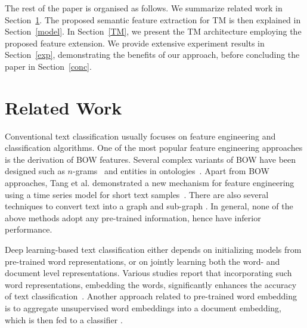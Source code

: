 \documentclass[11pt]{article}
\begin{document}
\par The rest of the paper is organised as follows. We summarize related work in Section~\ref{RW}. The proposed semantic feature extraction for TM is then explained in Section~\ref{model}. In Section~\ref{TM}, we present the  TM architecture employing the proposed feature extension. We provide extensive experiment results in Section~\ref{exp}, demonstrating the benefits of our approach, before concluding the paper in Section~\ref{conc}.





\section{Related Work}\label{RW}
Conventional text classification usually focuses on feature engineering and classification algorithms. One of the most popular feature engineering approaches is the derivation of BOW features. Several complex variants of BOW have been designed such as $n$-grams~\cite{wang2012} and entities in ontologies~\cite{ChenthamarakshanMSL11}. Apart from BOW approaches, Tang et al. demonstrated a new mechanism for feature engineering using a time series model for short text samples~\cite{Tang2020EnrichingFE}. There are also several techniques to convert text into a graph and sub-graph \cite{rousseau2015, Luo2017BridgingSA}. In general, none of the above methods adopt any pre-trained information, hence have inferior performance.

\par Deep learning-based text classification either depends on initializing models from pre-trained word representations, or on jointly learning both the word- and document level representations. Various studies report that incorporating such word representations, embedding the words, significantly enhances the accuracy of text classification~\cite{joulin2017bag,shen2018}. Another approach related to pre-trained word embedding is to aggregate unsupervised word embeddings into a document embedding, which is then fed to a classifier \cite{pmlrle14, jianPTE}. 
\end{document}
